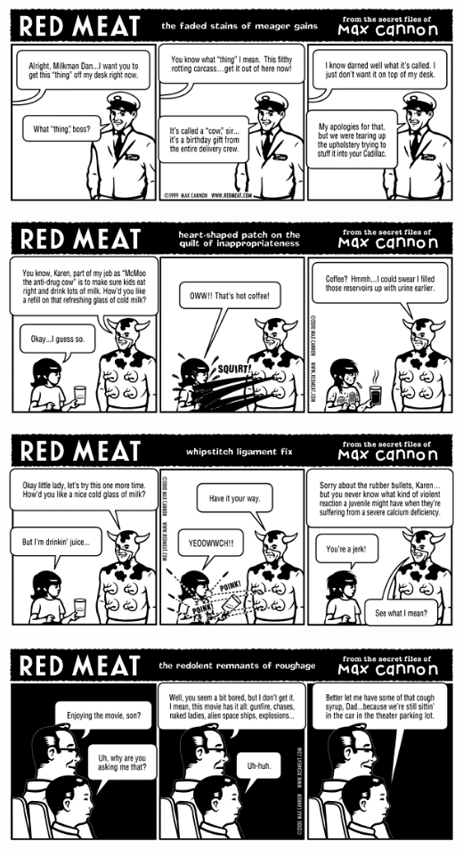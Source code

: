 \documentclass[a4paper,twoside,11pt]{article}
\begin{document}
\includegraphics[width=\textwidth]{redmeat_2000-02-15.png}



\includegraphics[width=\textwidth]{redmeat_2000-02-22.png}



\includegraphics[width=\textwidth]{redmeat_2000-02-29.png}



\includegraphics[width=\textwidth]{redmeat_2000-03-07.png}
\end{document}

